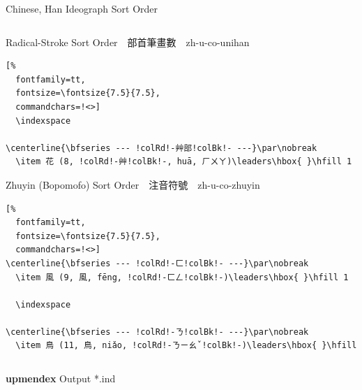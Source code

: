\documentclass[aspectratio=169,10pt]{beamer}
\begin{document}
\begin{frame}[fragile]{Chinese, Han Ideograph Sort Order}
\begin{columns}
\begin{column}{73mm}
\begin{exampleblock}{Radical-Stroke {\footnotesize Sort Order~~部首筆畫數~~\scriptsize zh-u-co-unihan}}
\begin{Verbatim}[%
  fontfamily=tt,
  fontsize=\fontsize{7.5}{7.5},
  commandchars=!<>]
  \indexspace

\centerline{\bfseries --- !colRd!-艸部!colBk!- ---}\par\nobreak
  \item 花 (8, !colRd!-艸!colBk!-, huā, ㄏㄨㄚ)\leaders\hbox{ }\hfill 1
\end{Verbatim}
\end{exampleblock}
\begin{exampleblock}{Zhuyin {\footnotesize (Bopomofo) Sort Order~~注音符號~~\scriptsize zh-u-co-zhuyin}}
\makeatletter
\def\verbatim@font{\fontsize{7.5}{7.5}\selectfont\textjapanese}
\makeatother
\begin{Verbatim}[%
  fontfamily=tt,
  fontsize=\fontsize{7.5}{7.5},
  commandchars=!<>]
\centerline{\bfseries --- !colRd!-ㄈ!colBk!- ---}\par\nobreak
  \item 風 (9, 風, fēng, !colRd!-ㄈㄥ!colBk!-)\leaders\hbox{ }\hfill 1

  \indexspace

\centerline{\bfseries --- !colRd!-ㄋ!colBk!- ---}\par\nobreak
  \item 鳥 (11, 鳥, niǎo, !colRd!-ㄋㄧㄠˇ!colBk!-)\leaders\hbox{ }\hfill
\end{Verbatim}
\end{exampleblock}
\end{column}
\end{columns}
\begin{center}
\textbf{upmendex} Output *.ind
\end{center}
\end{frame}

\end{document}
